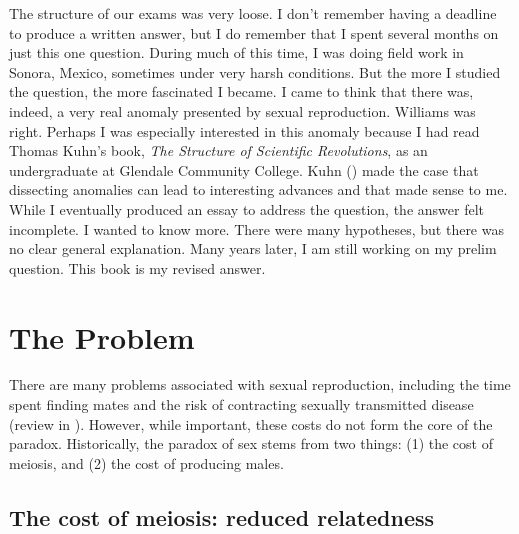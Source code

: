 \documentclass[
  letterpaper,
]{book}
\begin{document}
The structure of our exams was very loose. I don't remember having a
deadline to produce a written answer, but I do remember that I spent
several months on just this one question. During much of this time, I
was doing field work in Sonora, Mexico, sometimes under very harsh
conditions. But the more I studied the question, the more fascinated I
became. I came to think that there was, indeed, a very real anomaly
presented by sexual reproduction. Williams was right. Perhaps I was
especially interested in this anomaly because I had read Thomas Kuhn's
book, \emph{The Structure of Scientific Revolutions}, as an
undergraduate at Glendale Community College. Kuhn
() made the case that dissecting anomalies
can lead to interesting advances and that made sense to me. While I
eventually produced an essay to address the question, the answer felt
incomplete. I wanted to know more. There were many hypotheses, but there
was no clear general explanation. Many years later, I am still working
on my prelim question. This book is my revised answer.

\section{The Problem}\label{the-problem}

There are many problems associated with sexual reproduction, including
the time spent finding mates and the risk of contracting sexually
transmitted disease (review in ). However, while important, these costs do not form
the core of the paradox. Historically, the paradox of sex stems from two
things: (1) the cost of meiosis, and (2) the cost of producing males.

\subsection{The cost of meiosis: reduced
relatedness}\label{the-cost-of-meiosis-reduced-relatedness}
\end{document}
